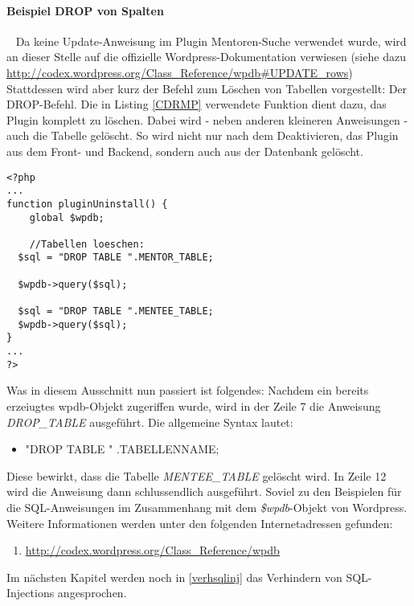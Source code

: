 \paragraph{Beispiel DROP von Spalten}\ \newline
Da keine Update-Anweisung im Plugin Mentoren-Suche verwendet wurde, wird an dieser Stelle auf die offizielle Wordpress-Dokumentation verwiesen (siehe dazu \url{http://codex.wordpress.org/Class\_Reference/wpdb\#UPDATE\_rows}) \newline
Stattdessen wird aber kurz der Befehl zum Löschen von Tabellen vorgestellt: Der DROP-Befehl. \newline
Die in Listing \ref{CDRMP} verwendete Funktion dient dazu, das Plugin komplett zu löschen. Dabei wird - neben anderen kleineren Anweisungen - auch die Tabelle gelöscht. So wird nicht nur nach dem Deaktivieren, das Plugin aus dem Front- und Backend, sondern auch aus der Datenbank gelöscht.
\begin{lstlisting}
<?php
...
function pluginUninstall() {
	global $wpdb;
	
	//Tabellen loeschen:
  $sql = "DROP TABLE ".MENTOR_TABLE;

  $wpdb->query($sql);

  $sql = "DROP TABLE ".MENTEE_TABLE;
  $wpdb->query($sql);
}
...
?>
\end{lstlisting}
Was in diesem Ausschnitt nun passiert ist folgendes: Nachdem ein bereits erzeiugtes wpdb-Objekt zugeriffen wurde, wird in der Zeile 7 die Anweisung \emph{DROP\_TABLE} ausgeführt. Die allgemeine Syntax lautet: 
\begin{itemize}
	\item "DROP TABLE " .TABELLENNAME;
\end{itemize}
Diese bewirkt, dass die Tabelle \emph{MENTEE\_TABLE} gelöscht wird. In Zeile 12 wird die Anweisung dann schlussendlich ausgeführt. Soviel zu den Beispielen für die SQL-Anweisungen im Zusammenhang mit dem \emph{\$wpdb}-Objekt von Wordpress.\newline
Weitere Informationen werden unter den folgenden Internetadressen gefunden:
\begin{enumerate}
	\item \url{http://codex.wordpress.org/Class_Reference/wpdb}
\end{enumerate}
Im nächsten Kapitel werden noch in \ref{verhsqlinj} das Verhindern von SQL-Injections angesprochen.
